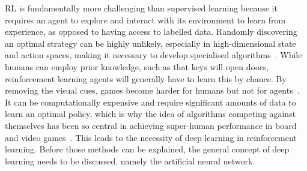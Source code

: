 RL is fundamentally more challenging than supervised learning because it requires an agent to explore and interact with its environment to learn from experience, as opposed to having access to labelled data.
Randomly discovering an optimal strategy can be highly unlikely, especially in high-dimensional state and action spaces, making it necessary to develop specialised algorithms~\autocite{sutton2018}.
While humans can employ prior knowledge, such as that keys will open doors, reinforcement learning agents will generally have to learn this by chance.
By removing the visual cues, games become harder for humans but not for agents~\autocite{dubey2018}.
It can be computationally expensive and require significant amounts of data to learn an optimal policy, which is why the idea of algorithms competing against themselves has been so central in achieving super-human performance in board and video games~\autocite{silver2016}.
This leads to the necessity of deep learning in reinforcement learning.
Before those methods can be explained, the general concept of deep learning needs to be discussed, namely the artificial neural network.
